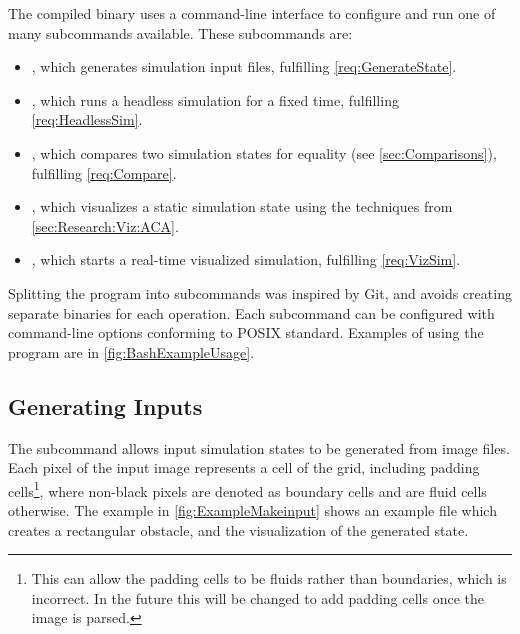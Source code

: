 The compiled binary uses a command-line interface to configure and run one of many subcommands available.
These subcommands are:\label{sec:DesignSubcommands}
\begin{itemize}
    \item {}, which generates simulation input files, fulfilling \cref{req:GenerateState}.
    \item {}, which runs a headless simulation for a fixed time, fulfilling \cref{req:HeadlessSim}.
    \item {}, which compares two simulation states for equality (see \cref{sec:Comparisons}), fulfilling \cref{req:Compare}.
    \item {}, which visualizes a static simulation state using the techniques from \cref{sec:Research:Viz:ACA}.
    \item {}, which starts a real-time visualized simulation, fulfilling \cref{req:VizSim}.
\end{itemize}
Splitting the program into subcommands was inspired by Git\cite{tool:Git}, and avoids creating separate binaries for each operation.
Each subcommand can be configured with command-line options conforming to POSIX standard\cite{IEEE2018UtilityConventions}.
Examples of using the program are in \cref{fig:BashExampleUsage}.


\subsection{Generating Inputs}
The  subcommand allows input simulation states to be generated from image files.
Each pixel of the input image represents a cell of the grid, including padding cells\footnote{This can allow the padding cells to be fluids rather than boundaries, which is incorrect. In the future this will be changed to add padding cells once the image is parsed.}, where non-black pixels are denoted as boundary cells and are fluid cells otherwise.
The example in \cref{fig:ExampleMakeinput} shows an example file which creates a rectangular obstacle, and the visualization of the generated state.


